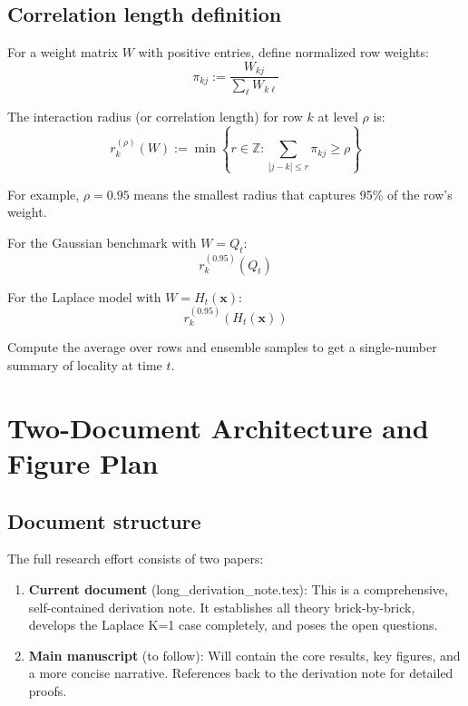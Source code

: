 \documentclass[11pt,a4paper]{article}
\theoremstyle{plain}
\theoremstyle{definition}
\newcommand{\Prec}{Q}
\newcommand{\vct}[1]{\mathbf{#1}}
\begin{document}
\subsection{Correlation length definition}
\label{sec:corr-length}

For a weight matrix $W$ with positive entries, define normalized row weights:
\begin{equation}
\pi_{kj} := \frac{W_{kj}}{\sum_{\ell}W_{k\ell}}
\end{equation}

The interaction radius (or correlation length) for row $k$ at level $\rho$ is:
\begin{equation}
r_k^{(\rho)}(W) := \min\left\{r \in \mathbb{Z} : \sum_{|j-k| \le r}\pi_{kj} \ge \rho\right\}
\end{equation}

For example, $\rho = 0.95$ means the smallest radius that captures 95\% of the row's weight.

For the Gaussian benchmark with $W = \Prec_t$:
\begin{equation}
r_k^{(0.95)}(\Prec_t)
\end{equation}

For the Laplace model with $W = H_t(\vct{x})$:
\begin{equation}
r_k^{(0.95)}(H_t(\vct{x}))
\end{equation}

Compute the average over rows and ensemble samples to get a single-number summary of locality at time $t$.

\section{Two-Document Architecture and Figure Plan}
\label{sec:architecture}

\subsection{Document structure}

The full research effort consists of two papers:

\begin{enumerate}
\item \textbf{Current document} (long\_derivation\_note.tex): This is a comprehensive, self-contained derivation note. It establishes all theory brick-by-brick, develops the Laplace K=1 case completely, and poses the open questions.

\item \textbf{Main manuscript} (to follow): Will contain the core results, key figures, and a more concise narrative. References back to the derivation note for detailed proofs.
\end{enumerate}
\end{document}
